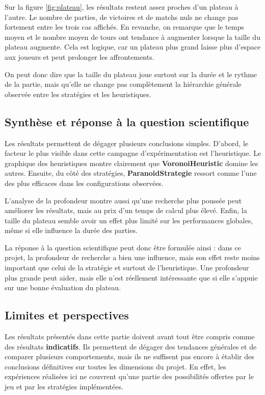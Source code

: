 \documentclass[11pt,a4paper]{article}
\begin{document}
Sur la figure \ref{fig:plateau}, les résultats restent assez proches d’un plateau à l’autre. Le nombre de parties, de victoires et de matchs nuls ne change pas fortement entre les trois cas affichés. En revanche, on remarque que le temps moyen et le nombre moyen de tours ont tendance à augmenter lorsque la taille du plateau augmente. Cela est logique, car un plateau plus grand laisse plus d’espace aux joueurs et peut prolonger les affrontements.

On peut donc dire que la taille du plateau joue surtout sur la durée et le rythme de la partie, mais qu’elle ne change pas complètement la hiérarchie générale observée entre les stratégies et les heuristiques.

\subsection{Synthèse et réponse à la question scientifique}

Les résultats permettent de dégager plusieurs conclusions simples. D’abord, le facteur le plus visible dans cette campagne d’expérimentation est l’heuristique. Le graphique des heuristiques montre clairement que \textbf{VoronoiHeuristic} domine les autres. Ensuite, du côté des stratégies, \textbf{ParanoidStrategie} ressort comme l’une des plus efficaces dans les configurations observées.

L’analyse de la profondeur montre aussi qu’une recherche plus poussée peut améliorer les résultats, mais au prix d’un temps de calcul plus élevé. Enfin, la taille du plateau semble avoir un effet plus limité sur les performances globales, même si elle influence la durée des parties.

La réponse à la question scientifique peut donc être formulée ainsi : dans ce projet, la profondeur de recherche a bien une influence, mais son effet reste moins important que celui de la stratégie et surtout de l’heuristique. Une profondeur plus grande peut aider, mais elle n’est réellement intéressante que si elle s’appuie sur une bonne évaluation du plateau.
\subsection{Limites et perspectives}

Les résultats présentés dans cette partie doivent avant tout être compris comme des résultats \textbf{indicatifs}. Ils permettent de dégager des tendances générales et de comparer plusieurs comportements, mais ils ne suffisent pas encore à établir des conclusions définitives sur toutes les dimensions du projet. En effet, les expériences réalisées ici ne couvrent qu’une partie des possibilités offertes par le jeu et par les stratégies implémentées.
\end{document}
